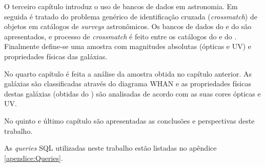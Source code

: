 O terceiro capítulo introduz o uso de bancos de dados em astronomia. Em seguida
é tratado do problema genérico de identificação cruzada ({\em crossmatch}) de
objetos em catálogos de {\em surveys} astronômicos. Os bancos de dados do \SDSS
e do \starlight são apresentados, e processo de {\em crossmatch} é feito entre
os catálogos do \SDSS e do \galex. Finalmente define-se uma amostra com
magnitudes absolutas (ópticas e UV) e propriedades físicas das galáxias.

No quarto capítulo é feita a análise da amostra obtida no capítulo anterior. As
galáxias são classificadas através do diagrama WHAN e as propriedades físicas
destas galáxias (obtidas do \starlight) são analisadas de acordo com as suas
cores ópticas e UV.

No quinto e último capítulo são apresentadas as conclusões e perspectivas deste
trabalho.

As {\em queries} SQL utilizadas neste trabalho estão listadas no apêndice
\ref{apendice:Queries}.

